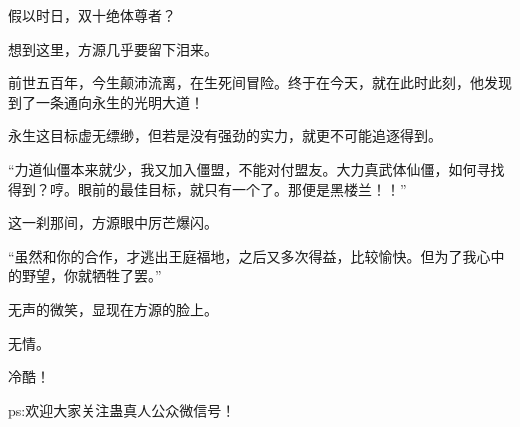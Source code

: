 \begin{this_body}
假以时日，双十绝体尊者？

想到这里，方源几乎要留下泪来。

前世五百年，今生颠沛流离，在生死间冒险。终于在今天，就在此时此刻，他发现到了一条通向永生的光明大道！

永生这目标虚无缥缈，但若是没有强劲的实力，就更不可能追逐得到。

“力道仙僵本来就少，我又加入僵盟，不能对付盟友。大力真武体仙僵，如何寻找得到？哼。眼前的最佳目标，就只有一个了。那便是黑楼兰！！”

这一刹那间，方源眼中厉芒爆闪。

“虽然和你的合作，才逃出王庭福地，之后又多次得益，比较愉快。但为了我心中的野望，你就牺牲了罢。”

无声的微笑，显现在方源的脸上。

无情。

冷酷！

ps:欢迎大家关注蛊真人公众微信号！

\end{this_body}

